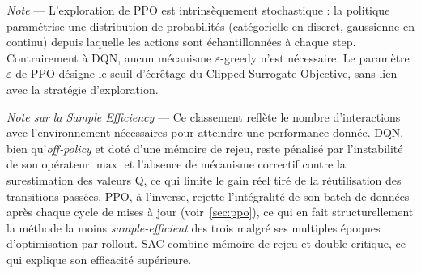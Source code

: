 \begin{table}[htp]
\centering

\caption{Comparaison des algorithmes DQN, PPO et SAC selon leurs caractéristiques fondamentales.}
\label{tab:algo-comparison}

\renewcommand{\arraystretch}{1.4}
\end{table}

\begin{flushleft}
\footnotesize
\textit{Note} --- L'exploration de PPO est intrinsèquement stochastique :
la politique paramétrise une distribution de probabilités (catégorielle en
discret, gaussienne en continu) depuis laquelle les actions sont
échantillonnées à chaque step. Contrairement à DQN, aucun mécanisme
$\varepsilon$-greedy n'est nécessaire. Le paramètre $\varepsilon$ de PPO
désigne le seuil d'écrêtage du Clipped Surrogate Objective, sans lien avec
la stratégie d'exploration.

\textit{Note sur la Sample Efficiency} --- Ce classement reflète le nombre d'interactions avec l'environnement nécessaires pour atteindre une performance donnée. DQN, bien qu'\textit{off-policy} et doté d'une mémoire de rejeu, reste pénalisé par l'instabilité de son opérateur $\max$ et l'absence de mécanisme correctif contre la surestimation des valeurs Q, ce qui limite le gain réel tiré de la réutilisation des transitions passées. PPO, à l'inverse, rejette l'intégralité de son batch de données après chaque cycle de mises à jour (voir~\ref{sec:ppo}), ce qui en fait structurellement la méthode la moins \textit{sample-efficient} des trois malgré ses multiples époques d'optimisation par rollout. SAC combine mémoire de rejeu et double critique, ce qui explique son efficacité supérieure.
\end{flushleft}


